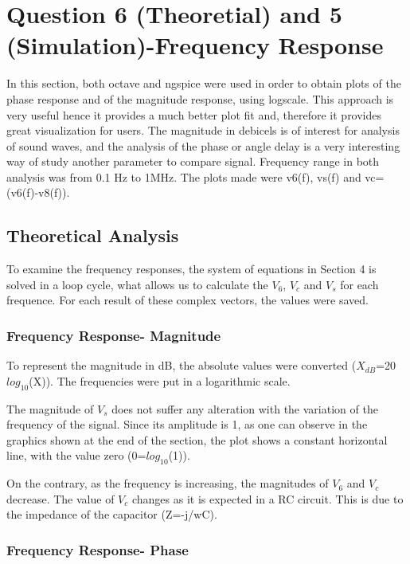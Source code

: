 \section{Question 6 (Theoretial) and 5 (Simulation)-Frequency Response}
In this section, both octave and ngspice were used in order to obtain plots of the phase response and of the magnitude response, using logscale. This approach is very useful hence it provides a much better plot fit and, therefore it provides great visualization for users. The magnitude in debicels is of interest for analysis of sound waves, and the analysis of the phase or angle delay is a very interesting way of study another parameter to compare signal. Frequency range in both analysis was from 0.1 Hz to 1MHz. The plots made were v6(f), vs(f) and vc=(v6(f)-v8(f)).

\subsection{Theoretical Analysis}

To examine the frequency responses, the system of equations in Section 4 is solved in a loop cycle, what allows us to calculate the $V_6$, $V_c$ and $V_s$ for each frequence. For each result of these complex vectors, the values were saved.

\subsubsection{Frequency Response- Magnitude}

To represent the magnitude in dB, the absolute values were converted ($X_{dB}$=20$log_{10}$(X)). The frequencies were put in a logarithmic scale.

The magnitude of $V_s$ does not suffer any alteration with the variation of the frequency of the signal. Since its amplitude is 1, as one can observe in the graphics shown at the end of the section, the plot shows a constant horizontal line, with the value zero (0=$log_{10}$(1)).

On the contrary, as the frequency is increasing, the magnitudes of $V_6$ and $V_c$ decrease. The value of $V_c$ changes as it is expected in a RC circuit. This is due to the impedance of the capacitor (Z=-j/wC).

\subsubsection{Frequency Response- Phase}


